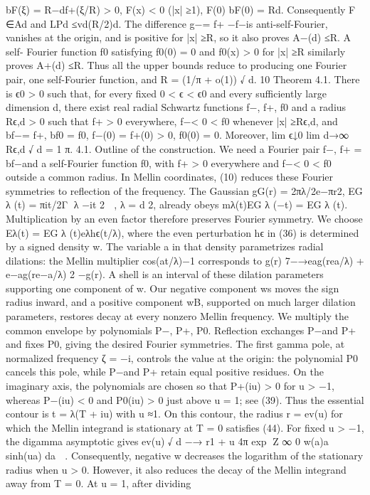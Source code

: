 bF(ξ) = R−df+(ξ/R) > 0,
F(x) < 0
(|x| ≥1),
F(0)
bF(0)
= Rd.
Consequently F ∈Ad and LPd ≤vd(R/2)d. The diﬀerence g−= f+ −f−is anti-self-Fourier,
vanishes at the origin, and is positive for |x| ≥R, so it also proves A−(d) ≤R.
A self-
Fourier function f0 satisfying f0(0) = 0 and f0(x) > 0 for |x| ≥R similarly proves A+(d) ≤R.
Thus all the upper bounds reduce to producing one Fourier pair, one self-Fourier function, and
R = (1/π + o(1))
√
d.
10
Theorem 4.1. There is ϵ0 > 0 such that, for every ﬁxed 0 < ϵ < ϵ0 and every suﬃciently large
dimension d, there exist real radial Schwartz functions f−, f+, f0 and a radius Rϵ,d > 0 such
that f+ > 0 everywhere, f−< 0 < f0 whenever |x| ≥Rϵ,d, and
bf−= f+,
bf0 = f0,
f−(0) = f+(0) > 0,
f0(0) = 0.
Moreover,
lim
ϵ↓0 lim
d→∞
Rϵ,d
√
d
= 1
π.
4.1. Outline of the construction. We need a Fourier pair f−, f+ = bf−and a self-Fourier
function f0, with f+ > 0 everywhere and f−< 0 < f0 outside a common radius. In Mellin
coordinates, (10) reduces these Fourier symmetries to reﬂection of the frequency. The Gaussian
gG(r) = 2πλ/2e−πr2,
EG
λ (t) = πit/2Γ
λ −it
2

,
λ = d
2,
already obeys mλ(t)EG
λ (−t) = EG
λ (t).
Multiplication by an even factor therefore preserves
Fourier symmetry. We choose Eλ(t) = EG
λ (t)eλhϵ(t/λ), where the even perturbation hϵ in (36) is
determined by a signed density w.
The variable a in that density parametrizes radial dilations: the Mellin multiplier cos(at/λ)−1
corresponds to
g(r) 7−→eag(rea/λ) + e−ag(re−a/λ)
2
−g(r).
A shell is an interval of these dilation parameters supporting one component of w. Our negative
component ws moves the sign radius inward, and a positive component wB, supported on much
larger dilation parameters, restores decay at every nonzero Mellin frequency.
We multiply the common envelope by polynomials P−, P+, P0. Reﬂection exchanges P−and
P+ and ﬁxes P0, giving the desired Fourier symmetries. The ﬁrst gamma pole, at normalized
frequency ζ = −i, controls the value at the origin: the polynomial P0 cancels this pole, while
P−and P+ retain equal positive residues. On the imaginary axis, the polynomials are chosen
so that P+(iu) > 0 for u > −1, whereas P−(iu) < 0 and P0(iu) > 0 just above u = 1; see (39).
Thus the essential contour is t = λ(T + iu) with u ≈1.
On this contour, the radius r = ev(u) for which the Mellin integrand is stationary at T = 0
satisﬁes (44). For ﬁxed u > −1, the digamma asymptotic gives
ev(u)
√
d
−→
r1 + u
4π
exp
Z ∞
0
w(a)a sinh(ua) da

.
Consequently, negative w decreases the logarithm of the stationary radius when u > 0. However,
it also reduces the decay of the Mellin integrand away from T = 0. At u = 1, after dividing
